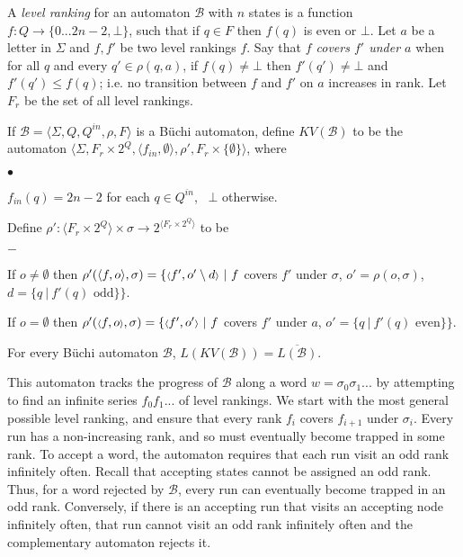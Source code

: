 \documentclass{LMCS}
\newcommand{\zug}[1]{\langle #1  \rangle}
\newcommand{\rzug}[1]{{\scriptstyle\langle} #1  {\scriptstyle\rangle}}
\newcommand\buchi{B\"uchi }
\newcommand{\B}{{\mathcal B}}
\begin{document}
A \emph{level ranking} for an automaton $\B$ with $n$ states is a function $f : Q \rightarrow
\{0...2n-2,\bot\}$, such that if $q \in F$ then $f(q)$ is even or $\bot$. Let $a$ be a letter in
$\Sigma$ and $f, f'$ be two level rankings $f$.  Say that \emph{$f$ covers $f'$ under $a$} when for
all $q$ and every $q' \in \rho(q,a)$, if $f(q) \neq \bot$ then $f'(q') \neq \bot$ and $f'(q') \leq
f(q)$; i.e. no transition between $f$ and $f'$ on $a$ increases in rank. Let $F_r$ be the set of all
level rankings.

\begin{defi}\label{KVDef}
If $\B = \zug{\Sigma, Q, Q^{in}, \rho, F}$ is a \buchi automaton, define
$KV(\B)$ to be the automaton $\zug{\Sigma, F_r \times 2^Q, \rzug{f_{in},\emptyset},
\rho', F_r \times \{\emptyset\}}$, where
\begin{iteMize}{$\bullet$}
\item $f_{in}(q)=2n-2$ for each $q \in Q^{in}$,~ $\bot$ otherwise.
\item Define $\rho' : \zug{F_r \times 2^Q} \times \sigma \rightarrow 2^{\zug{F_r \times 2^Q}}$ to be
\begin{iteMize}{$-$}
\item If $o\neq\emptyset$ then $\rho'(\zug{f,o},\sigma)=\\
\{\rzug{f',o'\setminus d}~|~ f$ covers $f'$ under $\sigma$, 
$o'=\rho(o,\sigma)$, 
$d=\{q~|~f'(q)\text{ odd}\}\}$.
\item If $o=\emptyset$ then $\rho'(\rzug{f,o},\sigma)=\\
\{\rzug{f',o'}~|~ f$ covers $f'$ under $a$, 
$o' = \{q~|~f'(q)\text{ even}\}\}$.
\end{iteMize}
\end{iteMize}
\end{defi}

\begin{lem}\label{KV_Complement}{\rm \cite{KV01}}
For every \buchi automaton $\B$, $L(KV(\B))=\overline{L(\B)}$.
\end{lem}

This automaton tracks the progress of $\B$ along a word $w=\sigma_0\sigma_1...$ by
attempting to find an infinite series $f_0f_1...$ of level rankings. We start
with the most general possible level ranking, and ensure that every rank $f_i$
covers $f_{i+1}$ under $\sigma_i$. Every run has a non-increasing rank, and so must
eventually become trapped in some rank. To accept a word, the automaton requires
that each run visit an odd rank infinitely often. Recall that accepting states
cannot be assigned an odd rank. Thus, for a word rejected by $\B$, every run can
eventually become trapped in an odd rank.  Conversely, if there is an accepting
run that visits an accepting node infinitely often, that run cannot visit an odd
rank infinitely often and the complementary automaton rejects it.
\end{document}
